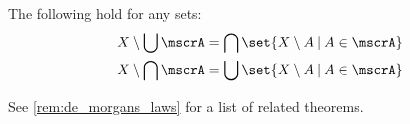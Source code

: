 \begin{theorem}\label{thm:de_morgans_laws_for_sets}
  The following hold for any sets:
  \begin{align}
    X \setminus \bigcup \mscrA = \bigcap \set{ X \setminus A \given A \in \mscrA } \label{eq:thm:de_morgans_laws_for_sets/complement_of_union} \\
    X \setminus \bigcap \mscrA = \bigcup \set{ X \setminus A \given A \in \mscrA } \label{eq:thm:de_morgans_laws_for_sets/complement_of_intersection}
  \end{align}
\end{theorem}
\begin{comments}
  \item See \cref{rem:de_morgans_laws} for a list of related theorems.
\end{comments}

